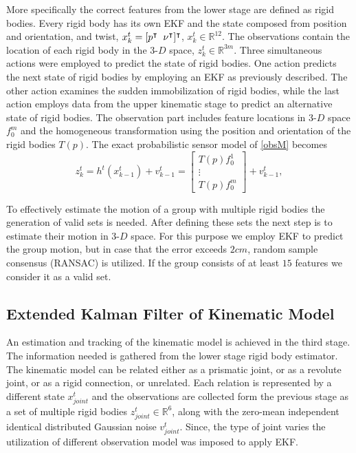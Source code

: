 \documentclass[letterpaper, 10 pt, conference]{ieeeconf}
\begin{document}
More specifically the correct features from the lower stage are defined as rigid bodies. Every rigid body has its own EKF and the state composed from position and orientation, and twist, $x_k^t = [ p^{\intercal} \hspace{.2cm} \nu^{\intercal} ] ^{\intercal}$, $x_k^t \in \mathbb{R}^{12}$. The observations contain the location of each rigid body in the 3-$D$ space, $z_k^t \in \mathbb{R}^{3m}$. Three simultaneous actions were employed to predict the state of rigid bodies. One action predicts the next state of rigid bodies by employing an EKF as previously described. The other action examines the sudden immobilization of rigid bodies, while the last action employs data from the upper kinematic stage to predict an alternative state of rigid bodies. The observation part includes feature locations in 3-$D$ space $f_0^m$ and the homogeneous transformation using the position and orientation of the rigid bodies $T(p)$. The exact probabilistic sensor model of \ref{obsM} becomes
\begin{equation}\label{obsMF}
z_k^t=h^t(x_{k-1}^t)+v_{k-1}^t= \begin{bmatrix}
T(p)f^1_{0} \\
\vdots \\
T(p)f^m_{0}
\end{bmatrix} + v_{k-1}^t,
\end{equation}

To effectively estimate the motion of a group with multiple rigid bodies the generation of valid sets is needed. After defining these sets the next step is to estimate their motion in 3-$D$ space. For this purpose we employ EKF to predict the group motion, but in case that the error exceeds $2cm$, random sample consensus (RANSAC) is utilized. If the group consists of at least $15$ features we consider it as a valid set.



\subsection{Extended Kalman Filter of Kinematic Model}\label{EKFkm}
An estimation and tracking of the kinematic model is achieved in the third stage. The information needed is gathered from the lower stage rigid body estimator. The kinematic model can be related either as a prismatic joint, or as a revolute joint, or as a rigid connection, or unrelated. Each relation is represented by a different state $x_{joint}^t$ and the observations are collected form the previous stage as a set of multiple rigid bodies $z_{joint}^t \in \mathbb{R}^6$, along with the zero-mean independent identical distributed Gaussian noise $v_{joint}^t$. Since, the type of joint varies the utilization of different observation model was imposed to apply EKF. 
\end{document}
